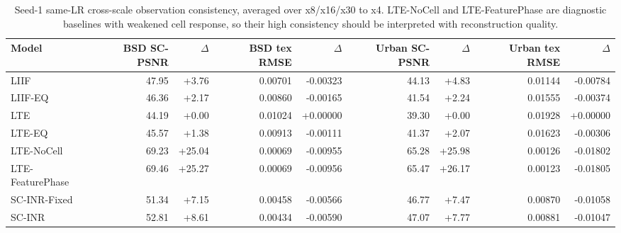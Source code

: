 \begin{table}[t]
\centering
\small
\caption{Seed-1 same-LR cross-scale observation consistency, averaged over x8/x16/x30 to x4. LTE-NoCell and LTE-FeaturePhase are diagnostic baselines with weakened cell response, so their high consistency should be interpreted with reconstruction quality.}
\label{tab:seed1_aux_consistency}
\begin{tabular}{lrrrrrrrr}
\toprule
Model & BSD SC-PSNR & $\Delta$ & BSD tex RMSE & $\Delta$ & Urban SC-PSNR & $\Delta$ & Urban tex RMSE & $\Delta$ \\
\midrule
LIIF & 47.95 & +3.76 & 0.00701 & -0.00323 & 44.13 & +4.83 & 0.01144 & -0.00784 \\
LIIF-EQ & 46.36 & +2.17 & 0.00860 & -0.00165 & 41.54 & +2.24 & 0.01555 & -0.00374 \\
LTE & 44.19 & +0.00 & 0.01024 & +0.00000 & 39.30 & +0.00 & 0.01928 & +0.00000 \\
LTE-EQ & 45.57 & +1.38 & 0.00913 & -0.00111 & 41.37 & +2.07 & 0.01623 & -0.00306 \\
LTE-NoCell & 69.23 & +25.04 & 0.00069 & -0.00955 & 65.28 & +25.98 & 0.00126 & -0.01802 \\
LTE-FeaturePhase & 69.46 & +25.27 & 0.00069 & -0.00956 & 65.47 & +26.17 & 0.00123 & -0.01805 \\
SC-INR-Fixed & 51.34 & +7.15 & 0.00458 & -0.00566 & 46.77 & +7.47 & 0.00870 & -0.01058 \\
SC-INR & 52.81 & +8.61 & 0.00434 & -0.00590 & 47.07 & +7.77 & 0.00881 & -0.01047 \\
\bottomrule
\end{tabular}
\end{table}
